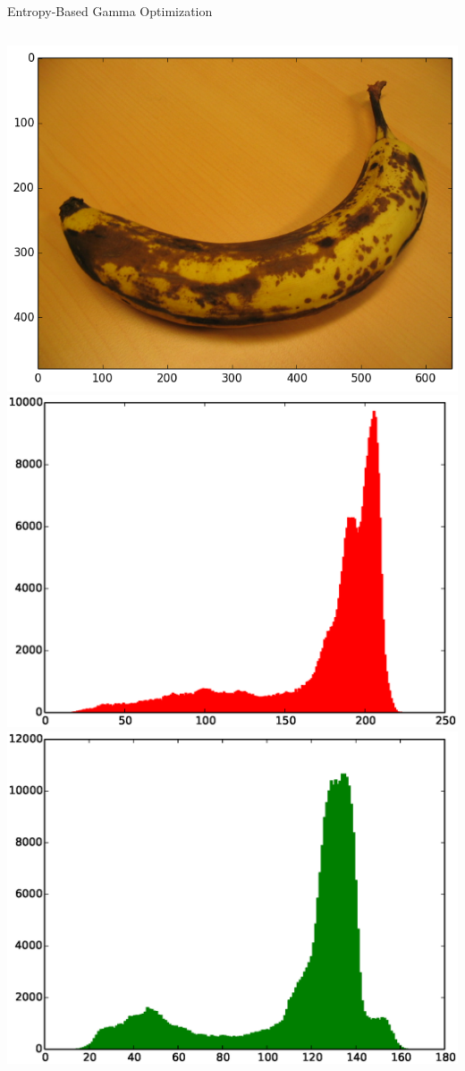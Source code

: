 \documentclass[compress,aspectratio=43]{beamer}
\begin{document}
\begin{frame}{Entropy-Based Gamma Optimization}
\begin{columns}[t]
\includegraphics[width=1\linewidth]{figures/gamma/banana/banana1-rgb.png}\\
\includegraphics[width=1\linewidth]{figures/gamma/banana/banana1-r.eps}\\
\includegraphics[width=1\linewidth]{figures/gamma/banana/banana1-g.eps}\\

\end{columns}
\end{frame}
\end{document}
